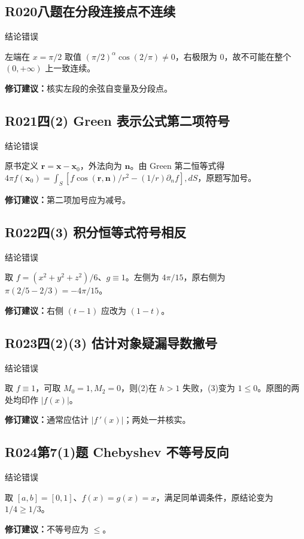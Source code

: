 \subsection*{R020\quad 八题在分段连接点不连续}
\noindent{}\quad 结论错误\par
左端在 $x=\pi/2$ 取值 $(\pi/2)^\alpha\cos(2/\pi)\ne0$，右极限为 $0$，故不可能在整个 $(0,+\infty)$ 上一致连续。
\par\textbf{修订建议：}核实左段的余弦自变量及分段点。\par
{}
\subsection*{R021\quad 四(2) Green 表示公式第二项符号}
\noindent{}\quad 结论错误\par
原书定义 $\boldsymbol r=\boldsymbol x-\boldsymbol x_0$，外法向为 $\boldsymbol n$。由 Green 第二恒等式得 $4\pi f(\boldsymbol x_0)=\int_S[f\cos(\boldsymbol r,\boldsymbol n)/r^2-(1/r)\partial_n f],dS$，原题写加号。
\par\textbf{修订建议：}第二项加号应为减号。\par
{}
\subsection*{R022\quad 四(3) 积分恒等式符号相反}
\noindent{}\quad 结论错误\par
取 $f=(x^2+y^2+z^2)/6$、$g\equiv1$。左侧为 $4\pi/15$，原右侧为 $\pi(2/5-2/3)=-4\pi/15$。
\par\textbf{修订建议：}右侧 $(t-1)$ 应改为 $(1-t)$。\par
{}
\subsection*{R023\quad 四(2)(3) 估计对象疑漏导数撇号}
\noindent{}\quad 结论错误\par
取 $f\equiv1$，可取 $M_0=1,M_2=0$，则(2)在 $h>1$ 失败，(3)变为 $1\le0$。原图的两处均印作 $|f(x)|$。
\par\textbf{修订建议：}通常应估计 $|f\,\prime(x)|$；两处一并核实。\par
{}
\subsection*{R024\quad 第7(1)题 Chebyshev 不等号反向}
\noindent{}\quad 结论错误\par
取 $[a,b]=[0,1]$、$f(x)=g(x)=x$，满足同单调条件，原结论变为 $1/4\ge1/3$。
\par\textbf{修订建议：}不等号应为 $\le$。\par
{}
